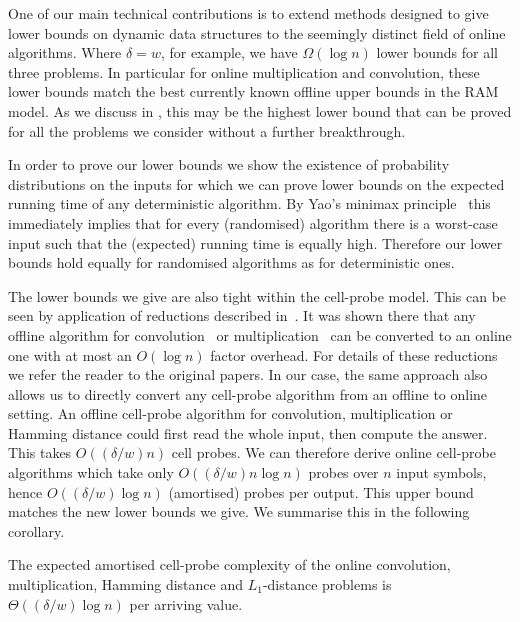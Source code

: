 \documentclass{toc}
\begin{document}
One of our main technical contributions is to extend  methods designed to give lower bounds on dynamic data structures to the seemingly distinct field of online algorithms.  Where $\delta = w$, for example, we have $\Omega(\log{n})$ lower bounds for all three problems. In particular for online multiplication and convolution, these lower bounds match the
%
best currently known   %
offline upper bounds in the RAM model. As we discuss in
%
, this may be the highest lower bound that can be
%
proved for all the problems we consider without a further
%
%
breakthrough.

In order to prove our lower bounds we show the existence of probability distributions on the inputs for which we can prove lower bounds on the expected running time of any deterministic algorithm. By Yao's minimax principle~\cite{Yao1977:Minimax} this immediately implies that for every (randomised) algorithm there is a worst-case input such that the (expected) running time is equally high. Therefore our lower bounds hold equally for randomised algorithms as for deterministic ones.

The lower bounds we give are also tight within the cell-probe model. This can be seen by application of reductions described in~\cite{FS:1973, CEPP:2011}.  It was shown there that any offline algorithm for convolution~\cite{CEPP:2011} or multiplication~\cite{FS:1973} can be converted to an online one with at most an $O(\log{n})$ factor overhead. For details of these reductions we refer the reader to the original papers.  In our case, the same approach also allows us to directly convert any cell-probe algorithm from an offline to online setting. An offline cell-probe algorithm for convolution, multiplication or Hamming distance could first read the whole input, then compute the
%
answer.
%
This takes $O{(({\delta}/{w}) n)}$ cell probes. We can therefore derive online cell-probe algorithms which take only $O{(({\delta}/{w})n\log n)}$ probes over $n$ input symbols, hence $O{(({\delta}/{w})\log n)}$ (amortised) probes per output. This upper bound matches the new lower bounds we give.
We summarise this in the following corollary.
%

\begin{corollary}\label{cor:final}
	The expected amortised cell-probe complexity of the online convolution, multiplication, Hamming distance and $L_1$-distance problems is $\Theta(({\delta}/{w})\log n)$ per arriving value.
\end{corollary}
\end{document}
